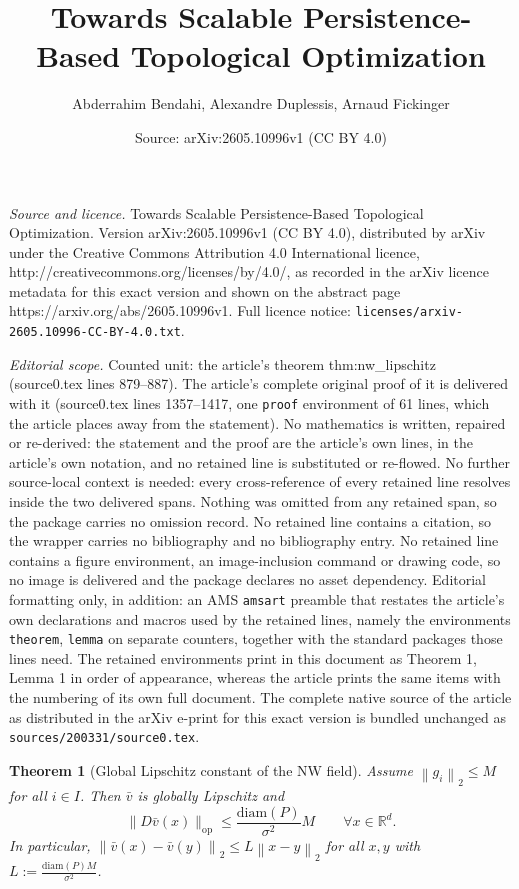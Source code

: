 \documentclass[10pt,a4paper]{amsart}
\title{Towards Scalable Persistence-Based Topological Optimization}
\author{Abderrahim Bendahi, Alexandre Duplessis, Arnaud Fickinger}
\date{Source: arXiv:2605.10996v1 (CC BY 4.0)}
\newtheorem{theorem}{Theorem}
\newcommand{\R}{\mathbb{R}}
\newcommand{\diam}{\mathrm{diam}}
\newcommand*{\norm}[1]{\left\|#1\right\|}
\begin{document}
\maketitle

\noindent\emph{Source and licence.} Towards Scalable Persistence-Based Topological Optimization. Version arXiv:2605.10996v1 (CC BY 4.0), distributed by arXiv under the Creative Commons Attribution 4.0 International licence, http://creativecommons.org/licenses/by/4.0/, as recorded in the arXiv licence metadata for this exact version and shown on the abstract page https://arxiv.org/abs/2605.10996v1. Full licence notice: \texttt{licenses/arxiv-2605.10996-CC-BY-4.0.txt}.\par\smallskip

\noindent\textit{Editorial scope.} Counted unit: the article's theorem thm:nw\_lipschitz (source0.tex lines 879--887). The article's complete original proof of it is delivered with it (source0.tex lines 1357--1417, one \texttt{proof} environment of 61 lines, which the article places away from the statement). No mathematics is written, repaired or re-derived: the statement and the proof are the article's own lines, in the article's own notation, and no retained line is substituted or re-flowed.  No further source-local context is needed: every cross-reference of every retained line resolves inside the two delivered spans.  Nothing was omitted from any retained span, so the package carries no omission record.  No retained line contains a citation, so the wrapper carries no bibliography and no bibliography entry.  No retained line contains a figure environment, an image-inclusion command or drawing code, so no image is delivered and the package declares no asset dependency.  Editorial formatting only, in addition: an AMS \texttt{amsart} preamble that restates the article's own declarations and macros used by the retained lines, namely the environments \texttt{theorem}, \texttt{lemma} on separate counters, together with the standard packages those lines need.  The retained environments print in this document as Theorem 1, Lemma 1 in order of appearance, whereas the article prints the same items with the numbering of its own full document.  The complete native source of the article as distributed in the arXiv e-print for this exact version is bundled unchanged as \texttt{sources/200331/source0.tex}.
\begin{theorem}[Global Lipschitz constant of the NW field]
\label{thm:nw_lipschitz}
Assume $\norm{g_i}_2\le M$ for all $i \in I$. Then $\bar v$ is globally Lipschitz and
\begin{equation}
\label{eq:nw_lipschitz}
    \|D\bar v(x)\|_{\mathrm{op}} \le \frac{\diam(P)}{\sigma^2} M \qquad \forall x \in \R^d.
\end{equation}
In particular, $\norm{\bar v(x) - \bar v(y)}_2 \le L \norm{x-y}_2$ for all $x, y$ with $L := \frac{\diam(P) M}{\sigma^2}$.
\end{theorem}
\end{document}
